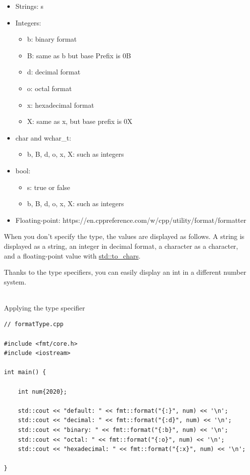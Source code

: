 \begin{itemize}
\item 
Strings: s

\item 
Integers:
\begin{itemize}
\item 
b: binary format

\item 
B: same as b but base Prefix is 0B

\item 
d: decimal format

\item 
o: octal format

\item 
x: hexadecimal format

\item 
X: same as x, but base prefix is 0X
\end{itemize}

\item 
char and wchar\_t:
\begin{itemize}
\item 
b, B, d, o, x, X: such as integers
\end{itemize}

\item 
bool:
\begin{itemize}
\item 
s: true or false

\item 
b, B, d, o, x, X: such as integers
\end{itemize}

\item 
Floating-point:
https://en.cppreference.com/w/cpp/utility/format/formatter
\end{itemize}

When you don’t specify the type, the values are displayed as follows. A string is displayed as a string, an integer in decimal format, a character as a character, and a floating-point value with \href{https://en.cppreference.com/w/cpp/utility/to_chars}{std::to\_chars}.

Thanks to the type specifiers, you can easily display an int in a different number system.

\hspace*{\fill} \\ %
\noindent
Applying the type specifier
\begin{lstlisting}[style=styleCXX]
// formatType.cpp

#include <fmt/core.h>
#include <iostream>

int main() {

	int num{2020};
	
	std::cout << "default: " << fmt::format("{:}", num) << '\n';
	std::cout << "decimal: " << fmt::format("{:d}", num) << '\n';
	std::cout << "binary: " << fmt::format("{:b}", num) << '\n';
	std::cout << "octal: " << fmt::format("{:o}", num) << '\n';
	std::cout << "hexadecimal: " << fmt::format("{:x}", num) << '\n';

}
\end{lstlisting}


